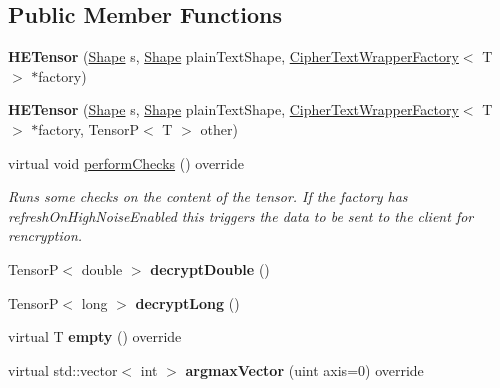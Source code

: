 \subsection*{Public Member Functions}
\begin{DoxyCompactItemize}
\item 
\mbox{\label{classHETensor_a7d20de8a5a4b73a5b26a530df8f5983f}} 
{\bfseries H\+E\+Tensor} (\hyperlink{classShape}{Shape} s, \hyperlink{classShape}{Shape} plain\+Text\+Shape, \hyperlink{classCipherTextWrapperFactory}{Cipher\+Text\+Wrapper\+Factory}$<$ T $>$ $\ast$factory)
\item 
\mbox{\label{classHETensor_adfa6d2f93f822c6f7294728b59a400ee}} 
{\bfseries H\+E\+Tensor} (\hyperlink{classShape}{Shape} s, \hyperlink{classShape}{Shape} plain\+Text\+Shape, \hyperlink{classCipherTextWrapperFactory}{Cipher\+Text\+Wrapper\+Factory}$<$ T $>$ $\ast$factory, TensorP$<$ T $>$ other)
\item 
\mbox{\label{classHETensor_a92788abf99e5d6773f021f1ef21886a7}} 
virtual void \hyperlink{classHETensor_a92788abf99e5d6773f021f1ef21886a7}{perform\+Checks} () override
\begin{DoxyCompactList}\small\item\em Runs some checks on the content of the tensor. If the factory has {\ttfamily refresh\+On\+High\+Noise\+Enabled} this triggers the data to be sent to the client for rencryption. \end{DoxyCompactList}\item 
\mbox{\label{classHETensor_af96ae9015195d89f91e44024cd6cc35c}} 
TensorP$<$ double $>$ {\bfseries decrypt\+Double} ()
\item 
\mbox{\label{classHETensor_aa52a0a3d339202b5dac7fcd507b00eb7}} 
TensorP$<$ long $>$ {\bfseries decrypt\+Long} ()
\item 
\mbox{\label{classHETensor_a3f94bbe3c8bc5f29666cf309b9251abf}} 
virtual T {\bfseries empty} () override
\item 
\mbox{\label{classHETensor_a0d9de653c9b2ec6963bb98ec5679be4b}} 
virtual std\+::vector$<$ int $>$ {\bfseries argmax\+Vector} (uint axis=0) override
\item 

\end{DoxyCompactItemize}
